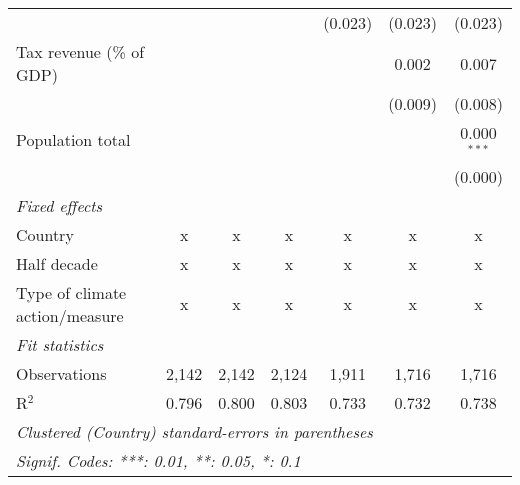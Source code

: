 \begin{tabular}{lcccccc}
                                                  &         &                &                & (0.023)        & (0.023)        & (0.023)\\   
   Tax revenue (\% of GDP)                        &         &                &                &                & 0.002          & 0.007\\   
                                                  &         &                &                &                & (0.009)        & (0.008)\\   
   Population total                               &         &                &                &                &                & 0.000$^{***}$\\   
                                                  &         &                &                &                &                & (0.000)\\   
   \emph{Fixed effects}\\
   Country                                        & x       & x              & x              & x              & x              & x\\  
   Half decade                                    & x       & x              & x              & x              & x              & x\\  
   Type of climate action/measure                 & x       & x              & x              & x              & x              & x\\  
   \midrule \emph{Fit statistics}\\
   Observations                                   & 2,142   & 2,142          & 2,124          & 1,911          & 1,716          & 1,716\\  
   R$^2$                                          & 0.796   & 0.800          & 0.803          & 0.733          & 0.732          & 0.738\\  
   \midrule
   \multicolumn{7}{l}{\emph{Clustered (Country) standard-errors in parentheses}}\\
   \multicolumn{7}{l}{\emph{Signif. Codes: ***: 0.01, **: 0.05, *: 0.1}}\\
\end{tabular}
\par\endgroup


